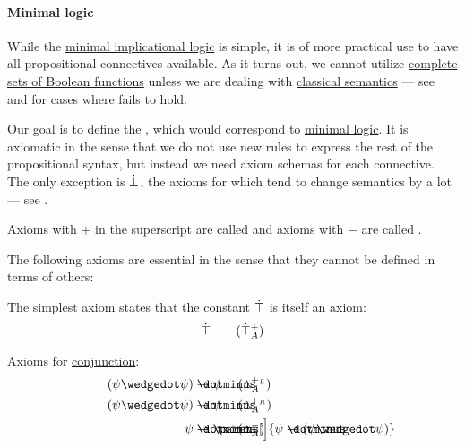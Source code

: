 \paragraph{Minimal logic}

\begin{definition}\label{def:minimal_propositional_hilbert_system}
  While the \hyperref[def:minimal_implication_logic]{minimal implicational logic} is simple, it is of more practical use to have all propositional connectives available. As it turns out, we cannot utilize \hyperref[def:boolean_closure/complete]{complete sets of Boolean functions} unless we are dealing with \hyperref[def:propositional_entailment]{classical semantics} --- see  and  for cases where  fails to hold.

  Our goal is to define the , which would correspond to \hyperref[def:minimal_logic]{minimal logic}. It is axiomatic in the sense that we do not use new rules to express the rest of the propositional syntax, but instead we need axiom schemas for each connective. The only exception is \hyperref[def:propositional_alphabet/constants/verum]{\( \dot\bot \)}, the axioms for which tend to change semantics by a lot --- see .

  Axioms with \( + \) in the superscript are called  and axioms with \( - \) are called .

  The following axioms are essential in the sense that they cannot be defined in terms of others:
  \begin{thmenum}[series=def:minimal_propositional_hilbert_system]
     The simplest axiom states that the constant \hyperref[def:propositional_alphabet/constants/verum]{\( \dot\top \)} is itself an axiom:
    \begin{equation}\label{eq:def:minimal_propositional_hilbert_system/top/intro}
      \syntop \tag{\( \syntop_A^+ \)}
    \end{equation}

     Axioms for \hyperref[def:propositional_alphabet/connectives/conjunction]{conjunction}:
    \begin{align}
      \mathllap{ (\psi \synwedge \psi) } &\synimplies \mathrlap{ \psi } \tag{\( \wedge_A^{+_L} \)} \label{eq:def:minimal_propositional_hilbert_system/and/elim_left} \\
      \mathllap{ (\psi \synwedge \psi) } &\synimplies \mathrlap{ \psi } \tag{\( \wedge_A^{+_R} \)} \label{eq:def:minimal_propositional_hilbert_system/and/elim_right} \\
      \mathllap{ \psi }               &\synimplies \mathrlap{ \parens[\Big]{ \psi \synimplies (\psi \synwedge \psi) } } \tag{\( \wedge_A^{-} \)} \label{eq:def:minimal_propositional_hilbert_system/and/intro}
    \end{align}


\end{thmenum}
\end{definition}
